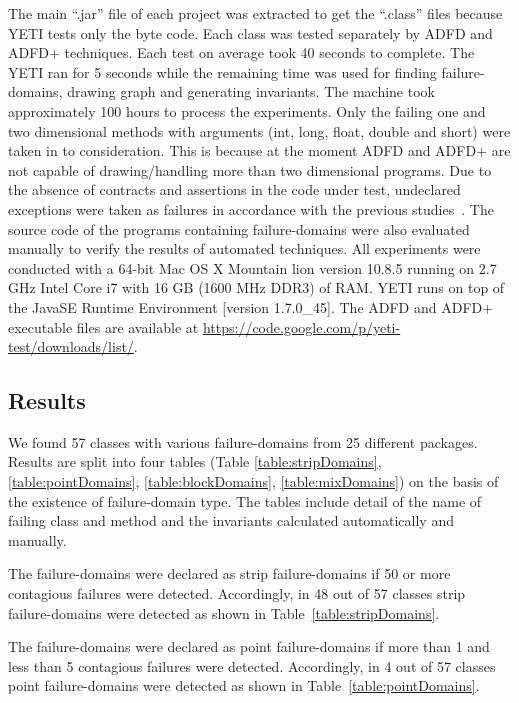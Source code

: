 \documentclass[runningheads,a4paper]{llncs}
\begin{document}
The main ``.jar'' file of each project was extracted to get the ``.class'' files because YETI tests only the byte code. Each class was tested separately by ADFD and ADFD+ techniques. Each test on average took 40 seconds to complete. The YETI ran for 5 seconds while the remaining time was used for finding failure-domains, drawing graph and generating invariants. The machine took approximately 100 hours to process the experiments. Only the failing one and two dimensional methods with arguments (int, long, float, double and short) were taken in to consideration. This is because at the moment ADFD and ADFD+ are not capable of drawing/handling more than two dimensional programs. Due to the absence of contracts and assertions in the code under test, undeclared exceptions were taken as failures in accordance with the previous studies~\cite{ahmad2013adfd}\cite{oriol2012random}. The source code of the programs containing failure-domains were also evaluated manually to verify the results of automated techniques. All experiments were conducted with a 64-bit Mac OS X Mountain lion version 10.8.5 running on 2.7 GHz Intel Core i7 with 16 GB (1600 MHz DDR3) of RAM. YETI runs on top of the Java\texttrademark  SE Runtime Environment [version 1.7.0\_45]. The ADFD and ADFD+ executable files are available at \url{https://code.google.com/p/yeti-test/downloads/list/}. 



\subsection{Results}
We found 57 classes with various failure-domains from 25 different packages. Results are split into four tables (Table \ref{table:stripDomains}, \ref{table:pointDomains}, \ref{table:blockDomains}, \ref{table:mixDomains}) on the basis of the existence of failure-domain type. The tables include detail of the name of failing class and method and the invariants calculated automatically and manually.  

The failure-domains were declared as strip failure-domains if 50 or more contagious failures were detected. 
Accordingly, in 48 out of 57 classes strip failure-domains were detected as shown in Table~\ref{table:stripDomains}. 

The failure-domains were declared as point failure-domains if more than 1 and less than 5 contagious failures were detected. Accordingly, in 4 out of 57 classes point failure-domains were detected as shown in Table~\ref{table:pointDomains}.
\end{document}
